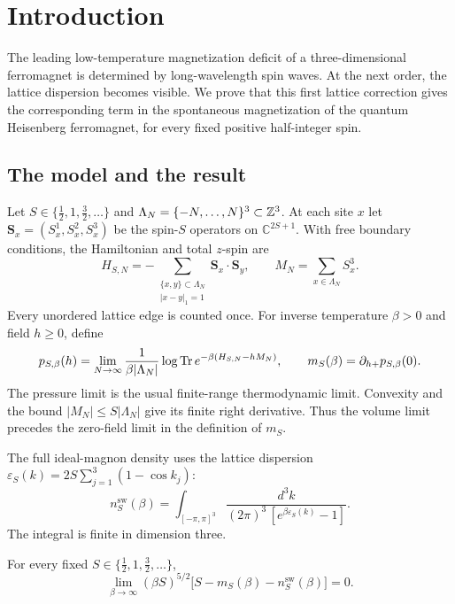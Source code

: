 \section{Introduction}\label{sec:introduction}

The leading low-temperature magnetization deficit of a three-dimensional
ferromagnet is determined by long-wavelength spin waves. At the next
order, the lattice dispersion becomes visible. We prove that this first
lattice correction gives the corresponding term in the spontaneous
magnetization of the quantum Heisenberg ferromagnet, for every fixed
positive half-integer spin.

\subsection{The model and the result}

Let $S\in\{\tfrac12,1,\tfrac32,\ldots\}$ and
$\Lambda_N=\{-N,\ldots,N\}^3\subset\mathbb Z^3$.
At each site $x$ let $\boldsymbol S_x=(S_x^1,S_x^2,S_x^3)$ be the
spin-$S$ operators on $\mathbb C^{2S+1}$. With free boundary conditions,
the Hamiltonian and total $z$-spin are
\[
 H_{S,N}=-\sum_{\substack{\{x,y\}\subset\Lambda_N\\ |x-y|_1=1}}
                \boldsymbol S_x\cdot\boldsymbol S_y,
 \qquad M_N=\sum_{x\in\Lambda_N}S_x^3.
\]
Every unordered lattice edge is counted once. For inverse temperature
$\beta>0$ and field $h\ge0$, define
\[
 p_{S,\beta}(h)
 =\lim_{N\to\infty}\frac1{\beta|\Lambda_N|}
             \log\operatorname{Tr} e^{-\beta(H_{S,N}-hM_N)},
 \qquad
 m_S(\beta)=\partial_{h+}p_{S,\beta}(0).
\]
The pressure limit is the usual finite-range thermodynamic limit.
Convexity and the bound $|M_N|\le S|\Lambda_N|$ give its finite right
derivative. Thus the volume limit precedes the zero-field limit in
the definition of $m_S$.

The full ideal-magnon density uses the lattice dispersion
$\varepsilon_S(k)=2S\sum_{j=1}^3(1-\cos k_j)$:
\begin{equation}\label{eq:ideal-density}
 n_S^{\mathrm{sw}}(\beta)
   =\int_{[-\pi,\pi]^3}
      \frac{d^3k}{(2\pi)^3\,[e^{\beta\varepsilon_S(k)}-1]}.
\end{equation}
The integral is finite in dimension three.

\begin{theorem}\label{thm:main}
For every fixed $S\in\{\tfrac12,1,\tfrac32,\ldots\}$,
\[
 \lim_{\beta\to\infty}(\beta S)^{5/2}
       \bigl[S-m_S(\beta)-n_S^{\mathrm{sw}}(\beta)\bigr]=0.
\]
\end{theorem}

